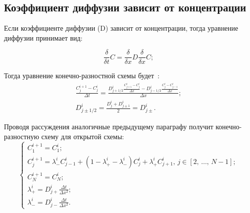 \subsection{Коэффициент диффузии зависит от концентрации}

Если коэффициенте диффузии (D) зависит от концентрации, тогда уравнение диффузии принимает вид:

\begin{equation}\label{eq:diffD(x)t}
	\frac{\delta}{\delta t} C = \frac{\delta}{\delta x}D\frac{\delta}{\delta x} C;
\end{equation}

Тогда уравнение конечно-разностной схемы будет~\cite{MethFD}:
\begin{gather}\label{eq:diffD(x)tFD}
	\frac{C_{j}^{i+1} - C_{j}^{i}}{\Delta t} = \frac{ D_{j+1/2}^{i}\frac{C^{i}_{j+1} - C^{i}_{j}}{\Delta x} - D_{j-1/2}^{i}\frac{C^{i}_{j} - C^{i}_{j-1}}{\Delta x} }{\Delta x};\\
	D_{j\pm1/2}^{i} = \frac{D^{i}_{j} + D^{i}_{j\pm1}}{2} = D_{j\pm}^{i}.
\end{gather}

Проводя рассуждения аналогичные предыдущему параграфу получит конечно-разностную схему для открытой схемы:
\begin{equation}
	\begin{cases}
		C^{i+1}_{1} = C^{i}_{1};\\
		C^{i+1}_{j} = \lambda_{-}^{i} C^{i}_{j-1} + (1 - \lambda^{i}_{+} - \lambda^{i}_{-})C^{i}_{j} + \lambda^{i}_{+} C^{i}_{j+1},\,j \in [2,\,\dots,\,N-1];\\
		C^{i+1}_{N} = C^{i}_{N};\\
		\lambda^{i}_{+} = D_{j+}^{i}\frac{\Delta t}{\Delta x^{2}};\\
		\lambda^{i}_{-} = D_{j-}^{i}\frac{\Delta t}{\Delta x^{2}}.
	\end{cases}
\end{equation}
